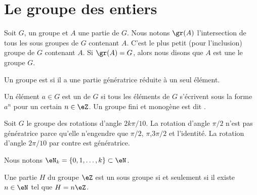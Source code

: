 \section{Le groupe des entiers}

\begin{definition}
    Soit \( G\), un groupe et \( A\) une partie de \( G\). Nous notons \( \gr(A)\) l'intersection de tous les sous groupes de \( G\) contenant \( A\). C'est le plus petit (pour l'inclusion) groupe de \( G\) contenant \( A\). Si \( \gr(A)=G\), alors nous disons que \( A\) est une  le groupe \( G\).

    Un groupe est  si il a une partie génératrice réduite à un seul élément.

    Un élément \( a\in G\) est un  de \( G\) si tous les éléments de \( G\) s'écrivent sous la forme \( a^n\) pour un certain \( n\in\eZ\). Un groupe fini et monogène est dit .
\end{definition}

\begin{example}
    Soit \( G\) le groupe des rotations d'angle \( 2k\pi/10\). La rotation d'angle \( \pi/2\) n'est pas génératrice parce qu'elle n'engendre que \( \pi/2\), \( \pi\),\( 3\pi/2\) et l'identité. La rotation d'angle \( 2\pi/10\) par contre est génératrice.
\end{example}


Nous notons \( \eN_{k}=\{ 0,1,\ldots, k \}\subset\eN\).
 
\begin{proposition} \label{PropSsgpZestnZ}
    Une partie \( H\) du groupe \( \eZ\) est un sous groupe si et seulement si il existe \( n\in\eN\) tel que \( H=n\eZ\).
\end{proposition}

